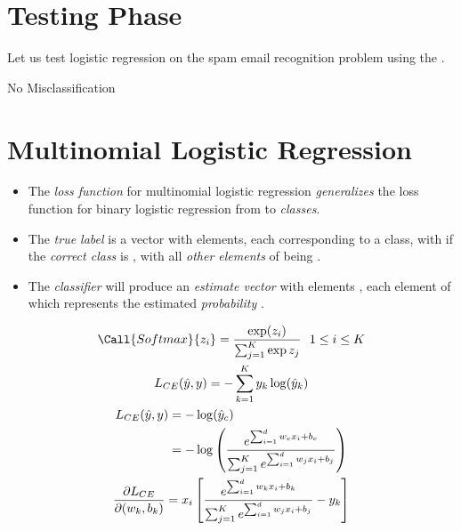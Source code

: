 \documentclass[
	number={4},
	title={Logistic Regression}
]{cs584notes}
\begin{document}
\section{Testing Phase}\label{sec:testing-phase}
Let us test logistic regression on the spam email recognition problem using the \data{$\theta = [0, 0, 0.5, 0, -0.5, 0.5]$}.

No Misclassification

\section{Multinomial Logistic Regression}\label{sec:multinomial-logistic-regression}
\begin{itemize}
	\item The \emph{loss function} for multinomial logistic regression \emph{generalizes} the loss function for binary logistic regression from  to  \emph{classes}.
	\item The \emph{true label}  is a vector with  elements, each corresponding to a class, with  if the \emph{correct class} is , with all \emph{other elements} of  being .
	\item The \emph{classifier} will produce an \emph{estimate vector} with  elements , each element  of which represents the estimated \emph{probability} .
\end{itemize}

\begin{gather}
	\Call{Softmax}{z_{i}} = \frac{\exp(z_{i})}{\sum_{j=1}^{K} \exp{z_{j}}}\ \ 1 \leq i \leq K\\
	\label{eq:multinomial-softmax}
	L_{CE}(\hat{y}, y) = -\sum_{k=1}^{K} y_{k} \log(\hat{y}_{k}) \\
	\begin{aligned}
		L_{CE}(\hat{y}, y) &= -\log(\hat{y}_{c})\\
						   &= -\log\left( \frac{e^{\sum_{i=1}^{d} w_{c}x_{i} + b_{c}}}{\sum_{j=1}^{K} e^{\sum_{i=1}^{d} w_{j}x_{i} + b_{j}}} \right)
	\end{aligned}\\
	\label{eq:multinomial-loss}
	\frac{\partial L_{CE}}{\partial (w_{k}, b_{k})} = x_{i}\left[ \frac{e^{\sum_{i=1}^{d} w_{k}x_{i} + b_{k}}}{\sum_{j=1}^{K} e^{\sum_{i=1}^{d} w_{j}x_{i} + b_{j}}} - y_{k} \right]
\end{gather}
\end{document}
